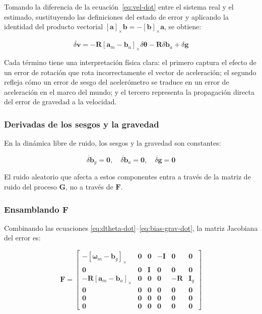 Tomando la diferencia de la ecuación~\eqref{eq:vel-dot} entre el sistema real y
el estimado, sustituyendo las definiciones del estado de error y aplicando la
identidad del producto vectorial $[\mathbf{a}]_\times \mathbf{b} = -[\mathbf{b}]_\times \mathbf{a}$,
se obtiene:

\begin{equation}
\dot{\delta\mathbf{v}} = -\mathbf{R} [\mathbf{a}_m - \mathbf{b}_a]_\times \delta\boldsymbol{\theta} - \mathbf{R} \delta\mathbf{b}_a + \delta\mathbf{g}
\label{eq:dv-dot}
\end{equation}

Cada término tiene una interpretación física clara: el primero captura el efecto
de un error de rotación que rota incorrectamente el vector de aceleración; el
segundo refleja cómo un error de sesgo del acelerómetro se traduce en un error
de aceleración en el marco del mundo; y el tercero representa la propagación
directa del error de gravedad a la velocidad.

\subsubsection{Derivadas de los sesgos y la gravedad}

En la dinámica libre de ruido, los sesgos y la gravedad son constantes:

\begin{equation}
\dot{\delta\mathbf{b}}_g = \mathbf{0}, \quad \dot{\delta\mathbf{b}}_a = \mathbf{0}, \quad \dot{\delta\mathbf{g}} = \mathbf{0}
\label{eq:bias-grav-dot}
\end{equation}

El ruido aleatorio que afecta a estos componentes entra a través de la matriz de
ruido del proceso $\mathbf{G}$, no a través de $\mathbf{F}$.

\subsubsection{Ensamblando F}

Combinando las ecuaciones \eqref{eq:dtheta-dot}--\eqref{eq:bias-grav-dot}, la
matriz Jacobiana del error es:

\begin{equation}
\mathbf{F} =
\begin{bmatrix}
-[\boldsymbol{\omega}_m - \mathbf{b}_g]_\times & \mathbf{0} & \mathbf{0} & -\mathbf{I} & \mathbf{0} & \mathbf{0} \\
\mathbf{0} & \mathbf{0} & \mathbf{I} & \mathbf{0} & \mathbf{0} & \mathbf{0} \\
-\mathbf{R}[\mathbf{a}_m - \mathbf{b}_a]_\times & \mathbf{0} & \mathbf{0} & \mathbf{0} & -\mathbf{R} & \mathbf{I}_g \\
\mathbf{0} & \mathbf{0} & \mathbf{0} & \mathbf{0} & \mathbf{0} & \mathbf{0} \\
\mathbf{0} & \mathbf{0} & \mathbf{0} & \mathbf{0} & \mathbf{0} & \mathbf{0} \\
\mathbf{0} & \mathbf{0} & \mathbf{0} & \mathbf{0} & \mathbf{0} & \mathbf{0}
\end{bmatrix}
\label{eq:F-matrix}
\end{equation}

